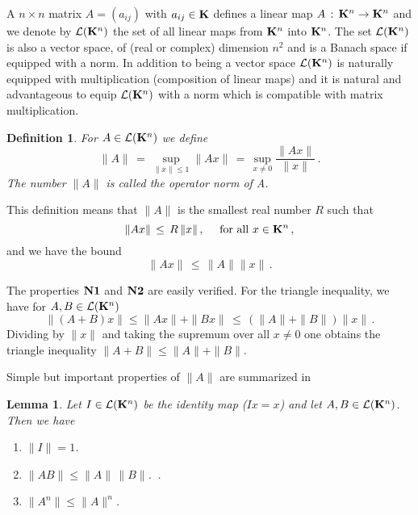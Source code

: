 \documentclass[12pt]{report}
\newcommand{\calL}{{\cal L}}
\newcommand{\bK}{{\bf K}}
\newtheorem{lemma}[theorem]{Lemma}
\newtheorem{definition}[theorem]{Definition}
\def\to{\rightarrow}
\begin{document}
A $n \times n$ matrix $A=(a_{ij})$ with $a_{ij} \in \bK$ defines a linear map 
$A \,:\, \bK^n \to \bK^n$ and we denote by  $\calL(\bK^n)$ the set of all linear maps 
from $\bK^n$ into $\bK^n$.  The set $\calL(\bK^n)$ is also a vector space, of (real or complex) 
dimension $n^2$ and is a Banach space if equipped with a norm.  In addition to being a 
vector space $\calL(\bK^n)$ is naturally equipped with  multiplication (composition of linear maps)
and it is natural and advantageous to equip $\calL(\bK^n)$ with a norm which is compatible
with matrix multiplication. 
 

\begin{definition}{\rm
For $A \in \calL(\bK^n)$ we define
\begin{equation}\label{opnorm}
\| A \| \,=\, \sup_{\|x\|\le 1} \|Ax\| \,=\, \sup_{x \not =0}
\frac{\|A x\|}{\|x\|} \,.
\end{equation}
The number $\|A\|$ is called the {\em operator norm} of A. 
}
\end{definition}
This definition means that $\|A\|$ is the smallest real number $R$ such that 
\begin{equation}\label{fine}
\|Ax\| \,\le\, R\,\|x\|\,, \quad {\rm ~for~all~} x \in \bK^n \,,
\end{equation}
and we have the bound 
\begin{equation}
\|Ax\| \,\le\, \|A\| \|x\| \,.
\end{equation}


The properties $\bf N1$ and $\bf N2$ are easily verified.  For
the triangle inequality, we have for $A,B \in \calL(\bK^n)$
\begin{equation}
\| (A+ B)x \| \le \|Ax \| + \|Bx\| \,\le\, \left( \|A\| + \|B\|
\right) \|x\| \,.
\end{equation}
Dividing by $\|x\|$ and taking the supremum over all $x\not=0$ one
obtains the triangle inequality $\|A + B\| \le \|A\| + \|B\|$.


Simple but  important properties of $\|A\|$ are summarized in

\begin{lemma} Let $I \in \calL(\bK^n)$ be the identity map ($Ix = x$) and 
let $A,B \in \calL(\bK^n)$.  Then we have 
\begin{enumerate}
\item $\| I \| = 1$.
\item $\|AB \| \le \|A\| \, \|B\|$. \,.
\item $\|A^n\| \le \|A\|^n$.  
\end{enumerate}
\end{lemma}
\end{document}
